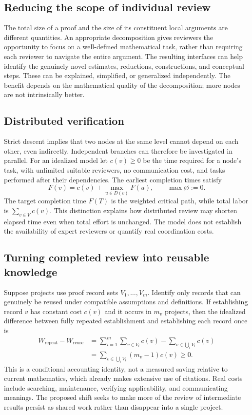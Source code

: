 \documentclass[11pt,a4paper]{article}
\theoremstyle{definition}\newtheorem{definition}{Definition}
\begin{document}
\subsection{Reducing the scope of individual review}
The total size of a proof and the size of its constituent local arguments are different quantities. An appropriate decomposition gives reviewers the opportunity to focus on a well-defined mathematical task, rather than requiring each reviewer to navigate the entire argument. The resulting interfaces can help identify the genuinely novel estimates, reductions, constructions, and conceptual steps. These can be explained, simplified, or generalized independently. The benefit depends on the mathematical quality of the decomposition; more nodes are not intrinsically better.

\subsection{Distributed verification}
Strict descent implies that two nodes at the same level cannot depend on each other, even indirectly. Independent branches can therefore be investigated in parallel. For an idealized model let $c(v)\ge0$ be the time required for a node's task, with unlimited suitable reviewers, no communication cost, and tasks performed after their dependencies. The earliest completion times satisfy
\[
 F(v)=c(v)+\max_{u\in D(v)}F(u),\qquad\max\varnothing:=0.
\]
The target completion time $F(T)$ is the weighted critical path, while total labor is $\sum_{v\in V}c(v)$. This distinction explains how distributed review may shorten elapsed time even when total effort is unchanged. The model does not establish the availability of expert reviewers or quantify real coordination costs.

\subsection{Turning completed review into reusable knowledge}
Suppose projects use proof record sets $V_1,\ldots,V_m$. Identify only records that can genuinely be reused under compatible assumptions and definitions. If establishing record $v$ has constant cost $c(v)$ and it occurs in $m_v$ projects, then the idealized difference between fully repeated establishment and establishing each record once is
\begin{align*}
 W_{\mathrm{repeat}}-W_{\mathrm{reuse}}
 &=\sum_{i=1}^m\sum_{v\in V_i}c(v)-\sum_{v\in\bigcup_i V_i}c(v)\\
 &=\sum_{v\in\bigcup_i V_i}(m_v-1)c(v)\ge0.
\end{align*}
This is a conditional accounting identity, not a measured saving relative to current mathematics, which already makes extensive use of citations. Real costs include searching, maintenance, verifying applicability, and communicating meanings. The proposed shift seeks to make more of the review of intermediate results persist as shared work rather than disappear into a single project.
\end{document}
